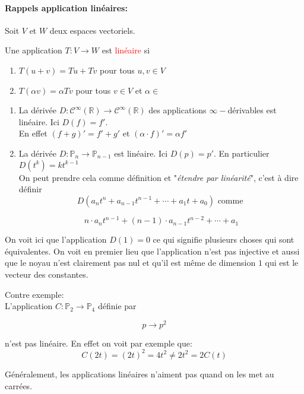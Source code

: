 \paragraph{Rappels application linéaires:}
Soit $V$ et $W$ deux espaces vectoriels.
\begin{definition}
    Une application $T : V \to W$ est \textcolor{red}{linéaire} si
    \begin{enumerate}
        \item $T(u + v) = Tu + Tv$ pour tous $u, v \in V$
        \item $T(\alpha v) = \alpha Tv$ pour tous $v \in V$ et $\alpha \in $\R
    \end{enumerate}
\end{definition}
\begin{exemple}
    \begin{enumerate}
        \item La dérivée $D : \mathcal{C}^\infty(\mathbb{R}) \to \mathcal{C}^\infty(\mathbb{R}) $ des applications $\infty-$dérivables est linéaire. Ici $D(f) = f'$.
        \\
        En effet $(f+g)' = f' + g'$ et $(\alpha\cdot f)' = \alpha f'$
        \item La dérivée $D : \mathbb{P}_n \to \mathbb{P}_{n-1}$ est linéaire. Ici $D(p) = p'$. En particulier $D(t^k) = kt^{k-1}$
        \\
        On peut prendre cela comme définition et "\textit{étendre par linéarité}", c'est à dire définir
        \[D(a_nt^n + a_{n-1}t^{n-1} + \cdots + a_1t + a_0) \text{ comme }\]
        \begin{formule}
            \[n\cdot a_n t^{n-1} + (n-1)\cdot a_{n-1}t^{n-2} + \cdots + a_1 \]
        \end{formule}
    \end{enumerate}
    \begin{framedremark}
        On voit ici que l'application $D(1) = 0$ ce qui signifie plusieurs choses qui sont équivalentes. On voit en premier lieu que l'application n'est pas injective et aussi que le noyau n'est clairement pas nul et qu'il est même de dimension $1$ qui est le vecteur des constantes.
    \end{framedremark}

    Contre exemple:
    \\ 
    L'application $C : \mathbb{P}_2 \to \mathbb{P}_4$ définie par 
    \begin{formule}
    \[p \to p^2\]
    \end{formule}
    n'est pas linéaire. En effet on voit par exemple que:
    \[C(2t) = (2t)^2 = 4t^2 \neq 2t^2 = 2C(t)\]
    \begin{framedremark}
        Généralement, les applications linéaires n'aiment pas quand on les met au carrées.
    \end{framedremark}
\end{exemple}


